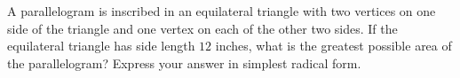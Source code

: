 A parallelogram is inscribed in an equilateral triangle with two vertices on one side of the triangle and one vertex on each of the other two sides. If the equilateral triangle has side length $12$ inches, what is the greatest possible area of the parallelogram? Express your answer in simplest radical form.
